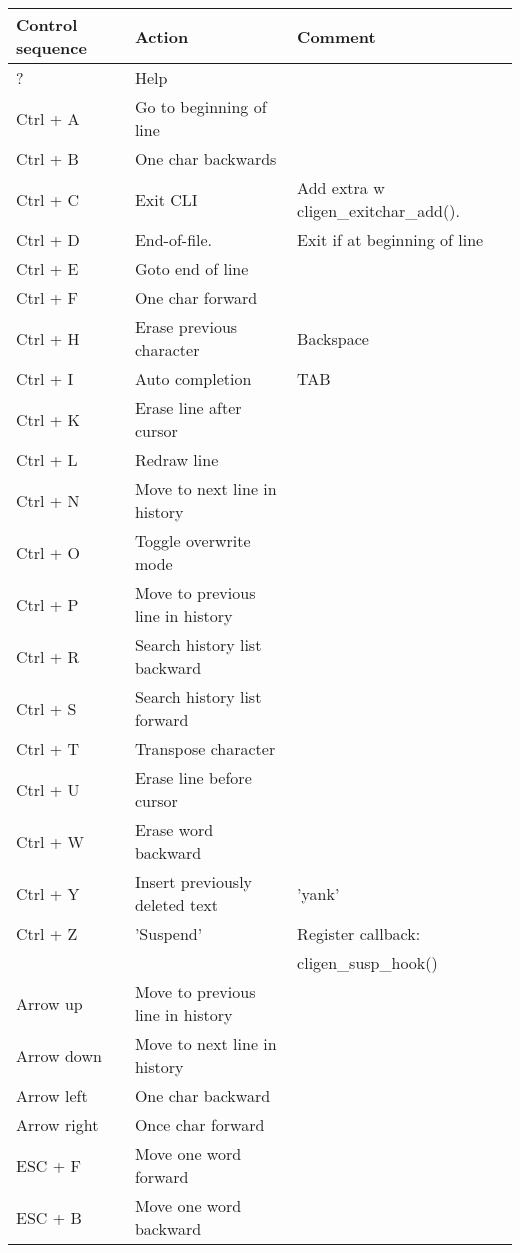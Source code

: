 \documentclass[a4paper, 10pt] {article}
\begin{document}
\begin{tabular}{ | l | l | l | }
\hline
  \textbf{ Control sequence} & \textbf{Action} & \textbf{Comment} \\
\hline
? & Help & \\
\hline
Ctrl + A & Go to beginning of line & \\
\hline
Ctrl + B & One char backwards & \\
\hline
Ctrl + C & Exit CLI & Add extra w cligen\_exitchar\_add().\\
\hline
Ctrl + D & End-of-file. & Exit if at beginning of line \\
\hline
Ctrl + E & Goto end of line & \\
\hline
Ctrl + F & One char forward & \\
\hline
Ctrl + H & Erase previous character & Backspace\\
\hline
Ctrl + I & Auto completion & TAB \\
\hline
Ctrl + K & Erase line after cursor & \\
\hline
Ctrl + L & Redraw line & \\
\hline
Ctrl + N & Move to next line in history & \\
\hline
Ctrl + O & Toggle overwrite mode & \\
\hline
Ctrl + P & Move to previous line in history & \\
\hline
Ctrl + R & Search history list backward & \\
\hline
Ctrl + S & Search history list forward & \\
\hline
Ctrl + T & Transpose character & \\
\hline
Ctrl + U & Erase line before cursor & \\
\hline
Ctrl + W & Erase word backward & \\
\hline
Ctrl + Y & Insert previously deleted text& 'yank' \\
\hline
Ctrl + Z & 'Suspend' & Register callback: \\&&cligen\_susp\_hook() \\
\hline
Arrow up & Move to previous line in history & \\
\hline
Arrow down & Move to next line in history & \\
\hline
Arrow left & One char backward & \\
\hline
Arrow right & Once char forward & \\
\hline
ESC + F & Move one word forward & \\
\hline
ESC + B & Move one word backward & \\
\hline
\end{tabular}
\end{document}
